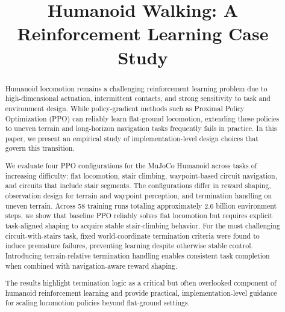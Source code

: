 \documentclass[conference]{IEEEtran}
\begin{document}
\title{Humanoid Walking: A Reinforcement Learning Case Study}

\author{
\and
{}
}

\maketitle

\begin{abstract}
Humanoid locomotion remains a challenging reinforcement learning problem due to high-dimensional actuation, intermittent contacts, and strong sensitivity to task and environment design.
While policy-gradient methods such as Proximal Policy Optimization (PPO) can reliably learn flat-ground locomotion, extending these policies to uneven terrain and long-horizon navigation tasks frequently fails in practice.
In this paper, we present an empirical study of implementation-level design choices that govern this transition.

We evaluate four PPO configurations for the MuJoCo Humanoid across tasks of increasing difficulty: flat locomotion, stair climbing, waypoint-based circuit navigation, and circuits that include stair segments.
The configurations differ in reward shaping, observation design for terrain and waypoint perception, and termination handling on uneven terrain.
Across 58 training runs totaling approximately 2.6 billion environment steps, we show that baseline PPO reliably solves flat locomotion but requires explicit task-aligned shaping to acquire stable stair-climbing behavior.
For the most challenging circuit-with-stairs task, fixed world-coordinate termination criteria were found to induce premature failures, preventing learning despite otherwise stable control.
Introducing terrain-relative termination handling enables consistent task completion when combined with navigation-aware reward shaping.

The results highlight termination logic as a critical but often overlooked component of humanoid reinforcement learning and provide practical, implementation-level guidance for scaling locomotion policies beyond flat-ground settings.
\end{abstract}
\end{document}
